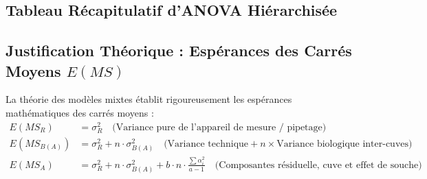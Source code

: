 \documentclass[11pt,a4paper]{article}
\begin{document}
\subsection{Tableau Récapitulatif d'ANOVA Hiérarchisée}
\begin{center}
\end{center}

\subsection{Justification Théorique : Espérances des Carrés Moyens $E(MS)$}

La théorie des modèles mixtes établit rigoureusement les espérances mathématiques des carrés moyens :
\begin{align*}
  E(MS_R) &= \sigma_R^2 \quad \text{(Variance pure de l'appareil de mesure / pipetage)} \\[1mm]
  E(MS_{B(A)}) &= \sigma_R^2 + n \cdot \sigma_{B(A)}^2 \quad \text{(Variance technique} + n \times \text{Variance biologique inter-cuves)} \\[1mm]
  E(MS_A) &= \sigma_R^2 + n \cdot \sigma_{B(A)}^2 + b \cdot n \cdot \frac{\sum \alpha_i^2}{a - 1} \quad \text{(Composantes résiduelle, cuve et effet de souche)}
\end{align*}
\end{document}
